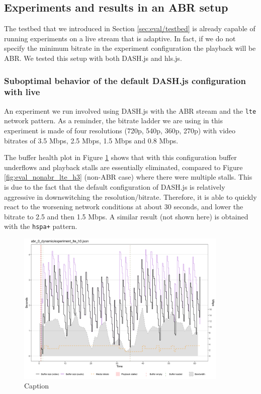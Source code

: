\subsection{Experiments and results in an ABR setup}
\label{sec:eval/abr}

The testbed that we introduced in Section \ref{sec:eval/testbed} is already capable of running experiments on a live stream that is adaptive. In fact, if we do not specify the minimum bitrate in the experiment configuration the playback will be ABR. We tested this setup with both DASH.js and hls.js.

\subsubsection{Suboptimal behavior of the default DASH.js configuration with live}
\label{sec:eval/abr/dashjs}

An experiment we run involved using DASH.js with the ABR stream and the \texttt{lte} network pattern. As a reminder, the bitrate ladder we are using in this experiment is made of four resolutions (720p, 540p, 360p, 270p) with video bitrates of 3.5 Mbps, 2.5 Mbps, 1.5 Mbps and 0.8 Mbps.

The buffer health plot in Figure \ref{fig:eval_abr_dashjs} shows that with this configuration buffer underflows and playback stalls are essentially eliminated, compared to Figure \ref{fig:eval_nonabr_lte_h3} (non-ABR case) where there were multiple stalls. This is due to the fact that the default configuration of DASH.js is relatively aggressive in downswitching the resolution/bitrate. Therefore, it is able to quickly react to the worsening network conditions at about 30 seconds, and lower the bitrate to 2.5 and then 1.5 Mbps. A similar result (not shown here) is obtained with the \texttt{hspa+} pattern.

\begin{figure}[h]
    \centering
    \includegraphics[width=0.9\textwidth]{res/eval_abr_dash_dynamic.png}
    \caption{Caption}
    \label{fig:eval_abr_dashjs}
\end{figure}

